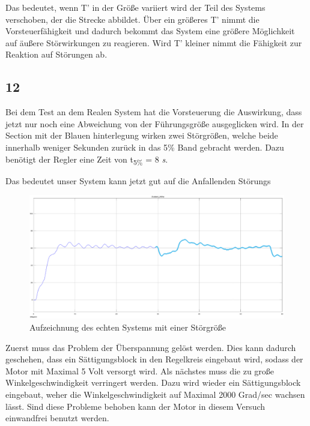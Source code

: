 \documentclass[10pt]{scrartcl}
\begin{document}
Das bedeutet, wenn T' in der Größe variiert wird der Teil des Systems verschoben, der die Strecke abbildet. Über ein größeres T' nimmt die Vorsteuerfähigkeit und dadurch bekommt das System eine größere Möglichkeit auf äußere Störwirkungen zu reagieren. Wird T' kleiner nimmt die Fähigkeit zur Reaktion auf Störungen ab.

\subsection{12}
Bei dem Test an dem Realen System hat die Vorsteuerung die Auswirkung, dass jetzt nur noch eine Abweichung von der Führungsgröße ausgeglicken wird. In der Section mit der Blauen hinterlegung wirken zwei Störgrößen, welche beide innerhalb weniger Sekunden zurück in das 5\% Band gebracht werden. Dazu benötigt der Regler eine Zeit von t\textsubscript{5\%}  = 8 \textit{s}. 

Das bedeutet unser System kann jetzt gut auf die Anfallenden Störungs
\begin{figure}[H]
	\centering
	\includegraphics[width=1.1\textwidth]{Figure312Regel}
	\caption{Aufzeichnung des echten Systems mit einer Störgröße}
	\label{img:grafik-dummy}
\end{figure}





Zuerst muss das Problem der Überspannung gelöst werden. Dies kann dadurch geschehen, dass ein Sättigungsblock in den Regelkreis eingebaut wird, sodass der Motor mit Maximal 5 Volt versorgt wird. Als nächstes muss die zu große Winkelgeschwindigkeit verringert werden. Dazu wird wieder ein Sättigungsblock eingebaut, weher die Winkelgeschwindigkeit auf Maximal 2000 Grad/sec wachsen lässt. Sind diese Probleme behoben kann der Motor in diesem Versuch einwandfrei benutzt werden. 
\end{document}
